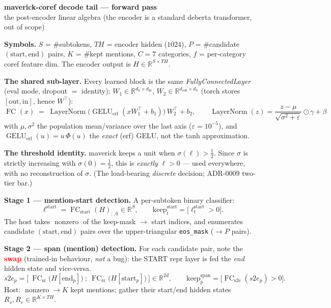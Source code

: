 \documentclass[11pt]{article}
\newcommand{\R}{\mathbb{R}}
\newcommand{\FC}[1]{\operatorname{FC}_{#1}}
\newcommand{\LN}{\operatorname{LayerNorm}}
\newcommand{\GELU}{\operatorname{GELU}}
\begin{document}
\begin{center}\large\textbf{maverick-coref decode tail — forward pass}\\
\small the post-encoder linear algebra (the encoder is a standard deberta transformer, out of scope)\end{center}

\textbf{Symbols.} $S$ = \#subtokens, $\mathit{TH}$ = encoder hidden ($1024$), $P$ = \#candidate
$(\text{start},\text{end})$ pairs, $K$ = \#kept mentions, $C=7$ categories, $f$ = per-category
coref feature dim. The encoder output is $H \in \R^{S\times \mathit{TH}}$.

\hrulefill

\textbf{The shared sub-layer.} Every learned block is the same
\emph{FullyConnectedLayer} (eval mode, dropout $=$ identity); $W_1\!\in\!\R^{d_h\times d_{\text{in}}}$,
$W_2\!\in\!\R^{d_{\text{out}}\times d_h}$ (torch stores $[\text{out},\text{in}]$, hence $W^\top$):
\[
\FC{}(x) \;=\; \LN\!\big(\GELU_{\mathrm{erf}}(x W_1^\top + b_1)\big)\,W_2^\top + b_2,
\qquad
\LN(z)=\frac{z-\mu}{\sqrt{\sigma^2+\varepsilon}}\odot\gamma+\beta
\]
with $\mu,\sigma^2$ the population mean/variance over the last axis ($\varepsilon=10^{-5}$), and
$\GELU_{\mathrm{erf}}(u)=u\,\Phi(u)$ the \emph{exact} (erf) GELU, not the tanh approximation.

\textbf{The threshold identity.} maverick keeps a unit when $\sigma(\ell)>\tfrac12$. Since $\sigma$ is
strictly increasing with $\sigma(0)=\tfrac12$, this is \emph{exactly} $\ell>0$ — used everywhere, with
no reconstruction of $\sigma$. (The load-bearing \emph{discrete} decision; ADR-0009 two-tier bar.)

\hrulefill

\textbf{Stage 1 — mention-start detection.} A per-subtoken binary classifier:
\[
\ell^{\text{start}} = \FC{\text{start}}(H)_{:,0}\in\R^{S},
\qquad
\text{keep}^{\text{start}}_t = \big[\ell^{\text{start}}_t > 0\big].
\]
The host takes $\operatorname{nonzero}$ of the keep-mask $\to$ start indices, and enumerates
candidate $(\text{start},\text{end})$ pairs over the upper-triangular \texttt{eos\_mask} ($\to P$ pairs).

\textbf{Stage 2 — span (mention) detection.} For each candidate pair, note the
\textcolor{red}{\textbf{swap}} (trained-in behaviour, \emph{not} a bug): the START repr layer is fed the
\emph{end} hidden state and vice-versa.
\[
s2e_p = \Big[\ \FC{\text{sr}}\big(H[\text{end}_p]\big)\ ;\ \FC{\text{er}}\big(H[\text{start}_p]\big)\ \Big]\in\R^{2d},
\qquad
\text{keep}^{\text{span}}_p = \big[\FC{\text{s2e}}(s2e_p)>0\big].
\]
Host: $\operatorname{nonzero}\to K$ kept mentions; gather their start/end hidden states
$R_s, R_e \in \R^{K\times \mathit{TH}}$.
\end{document}
